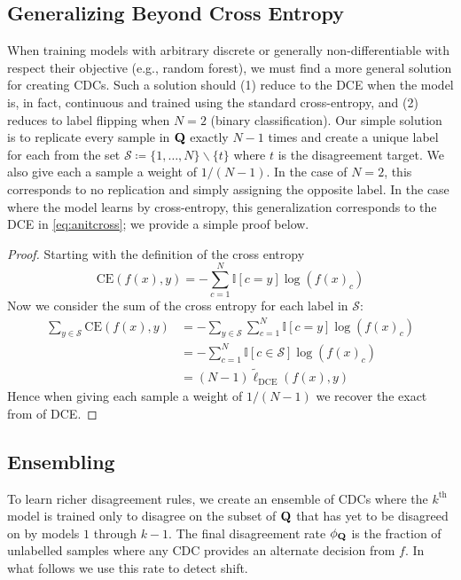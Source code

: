 \subsection{Generalizing Beyond Cross Entropy}\label{subsec:gen_beyond}     When training models with arbitrary discrete or generally non-differentiable with respect their objective (e.g., random forest), we must find a more general solution for creating CDCs.
Such a solution should (1) reduce to the DCE when the model is, in fact, continuous and trained using the standard cross-entropy, and (2) reduces to label flipping when $N=2$ (binary classification).
Our simple solution is to replicate every sample in $\mathbf{Q}$ exactly $N-1$ times and create a unique label for each
from the set $\mathcal{S}\coloneqq \{1,\dots,N\}\backslash \{t\}$ where $t$ is the disagreement target.
We also give each a sample a weight of $1/(N-1)$.
In the case of $N=2$, this corresponds to no replication and simply assigning the opposite label.
In the case where the model learns by cross-entropy, this generalization corresponds to the DCE in \autoref{eq:anitcross}; we provide a simple proof below.
\smallbreak\noindent
\begin{proof}
    Starting with the definition of the cross entropy
    \begin{equation}
        \text{CE}(f(x), y) = -\sum_{c=1}^N \mathbb{I}[{c=y}] \log(f(x)_c)
    \end{equation}
    Now we consider the sum of the cross entropy for each label in $\mathcal{S}$:
    \begin{align}
        \sum_{y\in \mathcal{S}} \text{CE}(f(x), y) &= -\sum_{y\in \mathcal{S}} \sum_{c=1}^{N}\mathbb{I}[{c=y}]\log(f(x)_c) \\
        &=-\sum_{c=1}^{N}\mathbb{I}[{c\in \mathcal{S}}]\log(f(x)_c)\\
        &= (N-1) \tilde{\ell}_\text{DCE}(f(x), y)
    \end{align}
    Hence when giving each sample a weight of $1/(N-1)$ we recover the exact from of DCE.
\end{proof}

\subsection{Ensembling} To learn richer disagreement rules, we create an
ensemble of CDCs where the $k^{\text{th}}$ model is trained only to disagree on the subset of
$\mathbf{Q}$ that has yet to be disagreed on by models $1$ through $k-1$.
The final disagreement rate $\phi_{\mathbf{Q}}$ is the fraction of unlabelled samples where any CDC provides an alternate decision from $f$.
In what follows we use this rate to detect shift.

